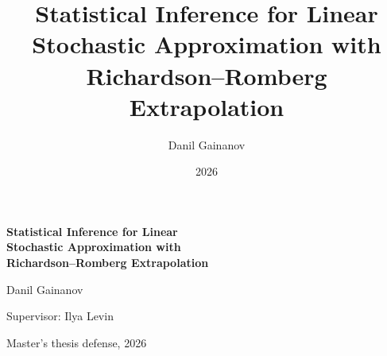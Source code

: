 \documentclass[11pt,aspectratio=169,xcolor=table]{beamer}
\title{Statistical Inference for Linear Stochastic Approximation with
Richardson--Romberg Extrapolation}
\author{Danil Gainanov}
\date{2026}
\begin{document}
\begin{frame}[plain]
  \vfill
  \begin{center}
    {\fontsize{22}{27}\selectfont\bfseries\color{ThesisBlue}
      Statistical Inference for Linear\\
      Stochastic Approximation with\\
      Richardson--Romberg Extrapolation\par}
    \vspace{1.3em}
    {\large Danil Gainanov\par}
    \vspace{0.5em}
    {\small\color{ThesisGray}Supervisor: Ilya Levin\par}
    \vspace{0.4em}
    {\small\color{ThesisGray}Master's thesis defense, 2026\par}
  \end{center}
  \vfill
\end{frame}
\end{document}
